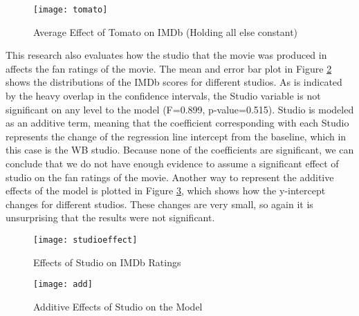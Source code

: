 \documentclass{svproc}
\begin{document}
\begin{figure}
\begin{center}
\caption{Average Effect of Tomato on IMDb (Holding all else constant)}
\medskip
\texttt{[image: tomato]}
\label{tomato}
\smallskip
\end{center}
\end{figure}

This research also evaluates how the studio that the movie was produced in affects the fan ratings of the movie. The mean and error bar plot in Figure \ref{studioeffect} shows the distributions of the IMDb scores for different studios. As is indicated by the heavy overlap in the confidence intervals, the Studio variable is not significant on any level to the model (F=0.899, p-value=0.515). Studio is modeled as an additive term, meaning that the coefficient corresponding with each Studio represents the change of the regression line intercept from the baseline, which in this case is the WB studio. Because none of the coefficients are significant, we can conclude that we do not have enough evidence to assume a significant effect of studio on the fan ratings of the movie. Another way to represent the additive effects of the model is plotted in Figure \ref{add}, which shows how the y-intercept changes for different studios. These changes are very small, so again it is unsurprising that the results were not significant.

\begin{figure}
\begin{center}
\caption{Effects of Studio on IMDb Ratings}
\texttt{[image: studioeffect]}
\label{studioeffect}
\smallskip
\end{center}
\end{figure}

\begin{figure}
\begin{center}
\caption{Additive Effects of Studio on the Model}
\texttt{[image: add]}
\label{add}
\smallskip
\end{center}
\end{figure}
\end{document}
